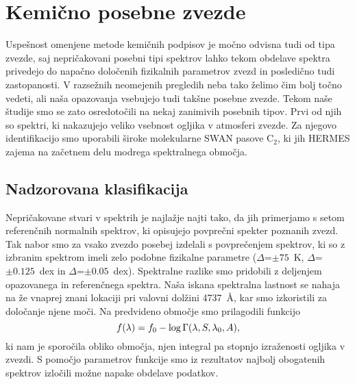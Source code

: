 \section{Kemično posebne zvezde}
\label{sec:slo_c_peculiars}
Uspešnost omenjene metode kemičnih podpisov je močno odvisna tudi od tipa zvezde, saj nepričakovani posebni tipi spektrov lahko tekom obdelave spektra privedejo do napačno določenih fizikalnih parametrov zvezd in posledično tudi zastopanosti. V razsežnih neomejenih pregledih neba tako želimo čim bolj točno vedeti, ali naša opazovanja vsebujejo tudi takšne posebne zvezde. Tekom naše študije smo se zato osredotočili na nekaj zanimivih posebnih tipov. Prvi od njih so spektri, ki nakazujejo veliko vsebnost ogljika v atmosferi zvezde. Za njegovo identifikacijo smo uporabili široke molekularne SWAN pasove C$_{2}$, ki jih HERMES zajema na začetnem delu modrega spektralnega območja. 

\subsection{Nadzorovana klasifikacija}
Nepričakovane stvari v spektrih je najlažje najti tako, da jih primerjamo s setom referenčnih normalnih spektrov, ki opisujejo povprečni spekter poznanih zvezd. Tak nabor smo za vsako zvezdo posebej izdelali s povprečenjem spektrov, ki so z izbranim spektrom imeli zelo podobne fizikalne parametre ($\Delta$\Teff=$\pm75$~K, $\Delta$\Logg=$\pm0.125$~dex in $\Delta$\Feh=$\pm0.05$~dex). Spektralne razlike smo pridobili z deljenjem opazovanega in referenčnega spektra. Naša iskana spektralna lastnost se nahaja na že vnaprej znani lokaciji pri valovni dolžini 4737~\AA, kar smo izkoristili za določanje njene moči. Na predvideno območje smo prilagodili funkcijo
\begin{equation}
\centering
f(\lambda) = f_0 - \log{}\Gamma(\lambda, S, \lambda_0, A),
\label{equ:slo_loggamma}
\end{equation}
ki nam je sporočila obliko območja, njen integral pa stopnjo izraženosti ogljika v zvezdi. S pomočjo parametrov funkcije smo iz rezultatov najbolj obogatenih spektrov izločili možne napake obdelave podatkov.

